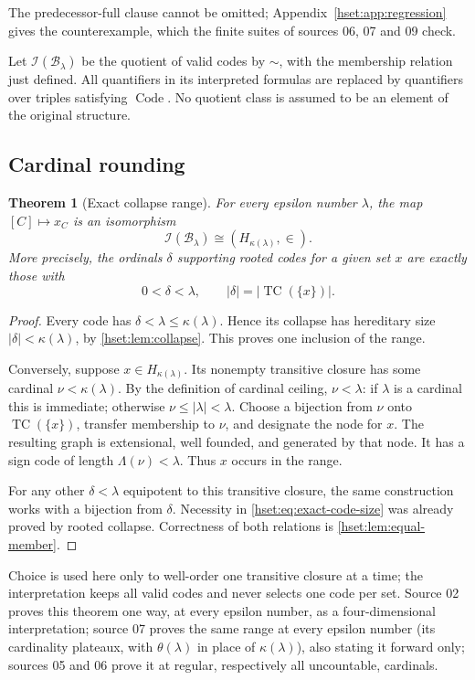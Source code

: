 \documentclass[11pt,letterpaper]{article}
\newtheorem{theorem}{Theorem}[section]
\theoremstyle{definition}
\theoremstyle{remark}
\newcommand{\TC}{\operatorname{TC}}
\newcommand{\B}{\mathcal B}
\newcommand{\I}{\mathcal I}
\newcommand{\Code}{\operatorname{Code}}
\newcommand{\card}[1]{\lvert#1\rvert}
\newcommand{\ceilcard}[1]{\kappa(#1)}
\begin{document}
The predecessor-full clause cannot be omitted; Appendix~\ref{hset:app:regression}
gives the counterexample, which the finite suites of sources 06, 07 and 09
check.

Let $\I(\B_\lambda)$ be the quotient of valid codes by $\sim$, with the
membership relation just defined. All quantifiers in its interpreted
formulas are replaced by quantifiers over triples satisfying $\Code$.
No quotient class is assumed to be an element of the original structure.

\subsection{Cardinal rounding}

\begin{theorem}[Exact collapse range]
\label{hset:thm:collapse-range}
For every epsilon number $\lambda$, the map $[C]\mapsto x_C$ is an
isomorphism
\[
 \I(\B_\lambda)\cong(H_{\ceilcard{\lambda}},\in).
\]
More precisely, the ordinals $\delta$ supporting rooted codes for a given
set $x$ are exactly those with
\begin{equation}
 0<\delta<\lambda,
 \qquad\card\delta=\card{\TC(\{x\})}.
 \label{hset:eq:exact-code-size}
\end{equation}
\end{theorem}
\begin{proof}
Every code has $\delta<\lambda\le\kappa(\lambda)$. Hence its collapse has
hereditary size $\card\delta<\kappa(\lambda)$, by
\cref{hset:lem:collapse}. This proves one inclusion of the range.

Conversely, suppose $x\in H_{\kappa(\lambda)}$. Its nonempty transitive
closure has some cardinal $\nu<\kappa(\lambda)$. By the definition of
cardinal ceiling, $\nu<\lambda$: if $\lambda$ is a cardinal this is
immediate; otherwise $\nu\le\card\lambda<\lambda$. Choose a bijection from
$\nu$ onto $\TC(\{x\})$, transfer membership to $\nu$, and designate the
node for $x$. The resulting graph is extensional, well founded, and generated
by that node. It has a sign code of length $\Lambda(\nu)<\lambda$.
Thus $x$ occurs in the range.

For any other $\delta<\lambda$ equipotent to this transitive closure, the
same construction works with a bijection from $\delta$. Necessity in
\eqref{hset:eq:exact-code-size} was already proved by rooted collapse.
Correctness of both relations is \cref{hset:lem:equal-member}.
\end{proof}

Choice is used here only to well-order one transitive closure at a time; the
interpretation keeps all valid codes and never selects one code per set.
Source 02 proves this theorem one way, at every epsilon number, as a
four-dimensional interpretation; source 07 proves the same range at every
epsilon number (its cardinality plateaux, with $\theta(\lambda)$ in place of
$\kappa(\lambda)$), also stating it forward only; sources 05 and 06 prove it at
regular, respectively all uncountable, cardinals.
\end{document}
